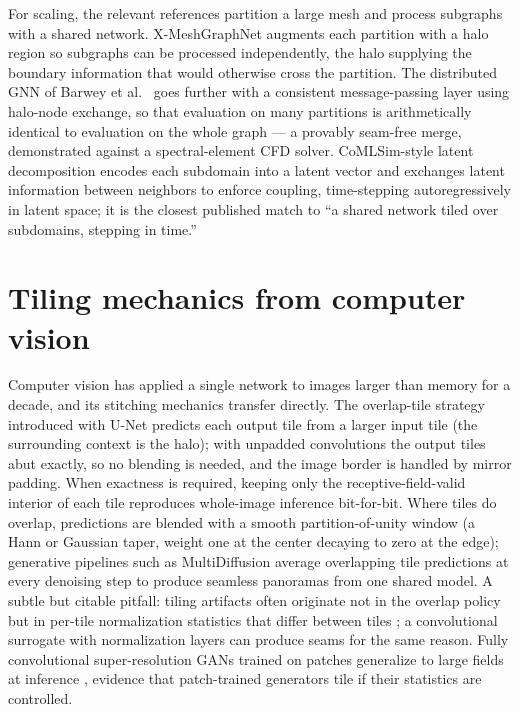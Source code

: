 \documentclass[11pt]{article}
\begin{document}
For scaling, the relevant references partition a large mesh and process subgraphs
with a shared network. X-MeshGraphNet \cite{nabian2024xmeshgraphnet} augments each
partition with a halo region so subgraphs can be processed independently, the
halo supplying the boundary information that would otherwise cross the partition.
The distributed GNN of Barwey et al.\ \cite{barwey2024consistentgnn} goes further
with a consistent message-passing layer using halo-node exchange, so that
evaluation on many partitions is arithmetically identical to evaluation on the
whole graph --- a provably seam-free merge, demonstrated against a spectral-element
CFD solver. CoMLSim-style latent decomposition \cite{hanna2024comlsim} encodes
each subdomain into a latent vector and exchanges latent information between
neighbors to enforce coupling, time-stepping autoregressively in latent space;
it is the closest published match to ``a shared network tiled over subdomains,
stepping in time.''

\section{Tiling mechanics from computer vision}

Computer vision has applied a single network to images larger than memory for a
decade, and its stitching mechanics transfer directly. The overlap-tile strategy
introduced with U-Net \cite{ronneberger2015unet} predicts each output tile from a
larger input tile (the surrounding context is the halo); with unpadded
convolutions the output tiles abut exactly, so no blending is needed, and the
image border is handled by mirror padding. When exactness is required, keeping
only the receptive-field-valid interior of each tile reproduces whole-image
inference bit-for-bit. Where tiles do overlap, predictions are blended with a
smooth partition-of-unity window (a Hann or Gaussian taper, weight one at the
center decaying to zero at the edge); generative pipelines such as MultiDiffusion
\cite{bartal2023multidiffusion} average overlapping tile predictions at every
denoising step to produce seamless panoramas from one shared model. A subtle but
citable pitfall: tiling artifacts often originate not in the overlap policy but
in per-tile normalization statistics that differ between tiles
\cite{buglakova2025tiling}; a convolutional surrogate with normalization layers
can produce seams for the same reason. Fully convolutional super-resolution GANs
trained on patches generalize to large fields at inference
\cite{stengel2020phiregan}, evidence that patch-trained generators tile if their
statistics are controlled.
\end{document}
